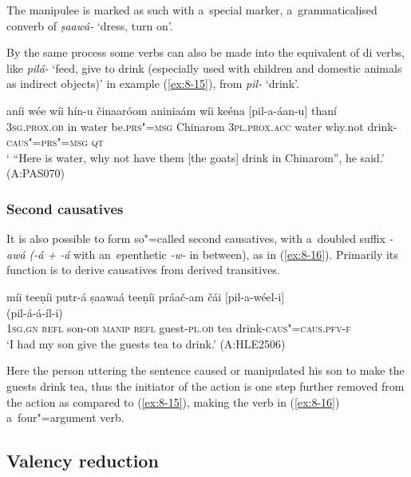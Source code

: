 The manipulee is marked as such with a~special marker, a~grammaticalised converb of \textit{ṣaawá-} `dress, turn on'. 


By the same process some  verbs can also be made into the equivalent of di verbs, like \textit{pilá-} `feed, give to drink (especially used with children and domestic animals as indirect objects)' in example (\ref{ex:8-15}), from \textit{pil-} `drink'. 

\begin{exe}
\ex
\label{ex:8-15}
\gll aníi wée wíi hín-u činaaróom aniniaám wíi keéna [pil-a-áan-u] thaní  \\
\textsc{3sg.prox.ob} in water be.\textsc{prs"=msg} Chinarom \textsc{3pl.prox.acc} water why.not drink-\textsc{caus"=prs"=msg} \textsc{qt} \\
\glt ` ``Here is water, why not have them [the goats] drink in Chinarom'', he said.' (A:PAS070)
\end{exe}

\subsubsection*{Second causatives}

It is also possible to form so"=called second causatives, with a~doubled  suffix \textit{-awá (-á + -á} with an~epenthetic \textit{-w-} in between), as in (\ref{ex:8-16}). Primarily its function is to derive causatives from derived transitives.

\begin{exe}
\ex
\label{ex:8-16}
\glll míi teeṇíi putr-á ṣaawaá teeṇíi práač-am čái
     [pil-a-wéel-i]\\
	{} {} {} {} {} {} {}  (pil-á-á-íl-i)\\
\textsc{1sg.gn} \textsc{refl} son-\textsc{ob} \textsc{manip} \textsc{refl} guest-\textsc{pl.ob} tea drink-\textsc{caus"=caus.pfv-f}\\
\glt `I had my son give the guests tea to drink.' (A:HLE2506)
\end{exe}

Here the person uttering the sentence caused or manipulated his son to make the guests drink tea, thus the initiator of the action is one step further removed from the action as compared to (\ref{ex:8-15}), making the verb in (\ref{ex:8-16}) a~four"=argument verb. 


\subsection{Valency reduction}
\label{subsec:8-5-2}

